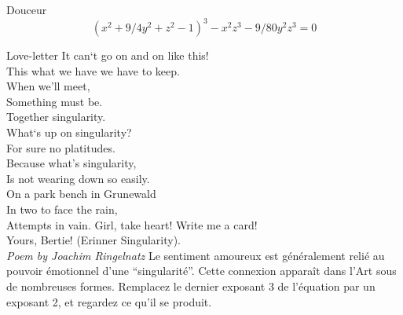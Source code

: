 \begin{surferPage}{Douceur}
\[(x^2+ 9/4y^2	+ z^2- 1)^3- x^2z^3	- 9/80y^2z^3	= 0\]

\singlespacing
Love-letter
\singlespacing
It can`t go on and on like this!\\
This what we have we have to keep.\\
When we'll meet,\\
Something must be.\\
Together singularity.\\
What`s up on singularity?\\
For sure no platitudes.\\
Because what's singularity,\\
Is not wearing down so easily.\\
On a park bench in Grunewald\\
In two to face the rain,\\
Attempts in vain. Girl, take heart! Write me a card!\\
Yours, Bertie! (Erinner Singularity).\\
{\it Poem by Joachim Ringelnatz}
\singlespacing 
Le sentiment amoureux est généralement relié au pouvoir émotionnel d'une ``singularité''. Cette connexion apparaît dans l'Art sous de nombreuses formes.
\singlespacing 
Remplacez le dernier exposant 3 de l'équation par un exposant 2, et regardez ce qu'il se produit.
\end{surferPage}
